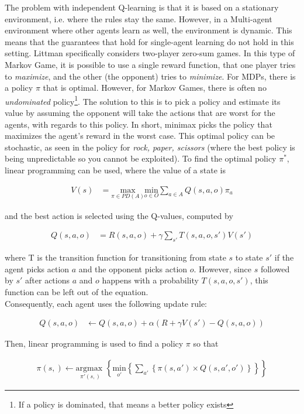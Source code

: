 The problem with independent Q-learning is that it is based on a stationary environment, i.e. where the rules stay the same. However, in a Multi-agent environment where other agents learn as well, the environment is dynamic. This means that the guarantees that hold for single-agent learning do not hold in this setting. Littman \cite{Littman94markovgames} specifically considers two-player zero-sum games. In this type of Markov Game, it is possible to use a single reward function, that one player tries to \textit{maximize}, and the other (the opponent) tries to \textit{minimize}. For MDPs, there is a policy $\pi$ that is optimal. However, for Markov Games, there is often no \textit{undominated} policy\footnote{If a policy is dominated, that means a better policy exists}. The solution to this is to pick a policy and estimate its value by assuming the opponent will take the actions that are worst for the agents, with regards to this policy. In short, minimax picks the policy that maximizes the agent's reward in the worst case. This optimal policy can be stochastic, as seen in the policy for \textit{rock, paper, scissors} (where the best policy is being unpredictable so you cannot be exploited). To find the optimal policy $\pi^*$, linear programming can be used, where the value of a state is
\begin{mdframed}
\begin{align}
V(s) &= \underset{\pi \in PD(A)}{\text{max}} \underset{o \in O}{\text{min}} \sum_{a\in A} Q(s,a,o) \pi_a
\end{align}
\end{mdframed}
and the best action is selected using the Q-values, computed by
\begin{mdframed}
\begin{align}
Q(s,a,o) &= R(s,a,o) + \gamma \sum_{s'} T(s,a,o,s') V(s')
\end{align}
\end{mdframed}
where T is the transition function for transitioning from state $s$ to state $s'$ if the agent picks action $a$ and the opponent picks action $o$. However, since $s$ followed by $s'$ after actions $a$ and $o$ happens with a probability $T(s,a,o,s')$, this function can be left out of the equation.\\

Consequently, each agent uses the following update rule:

\begin{mdframed}
\begin{align}
Q(s,a,o) & \leftarrow Q(s,a,o) + \alpha (R + \gamma V(s') - Q(s,a,o))
\end{align}
\label{ref:minimaxrule}
\end{mdframed}
Then, linear programming is used to find a policy $\pi$ so that
\begin{mdframed}
\begin{align}
\pi(s,) \leftarrow \underset{\pi'(s,)}{\text{argmax }} \left\{ \underset{o'}{\text{min}} \left\{ \sum_{a'}  \left\{ \pi(s,a') \times Q(s,a',o') \right\} \right\} \right\}
\end{align}
\end{mdframed}

